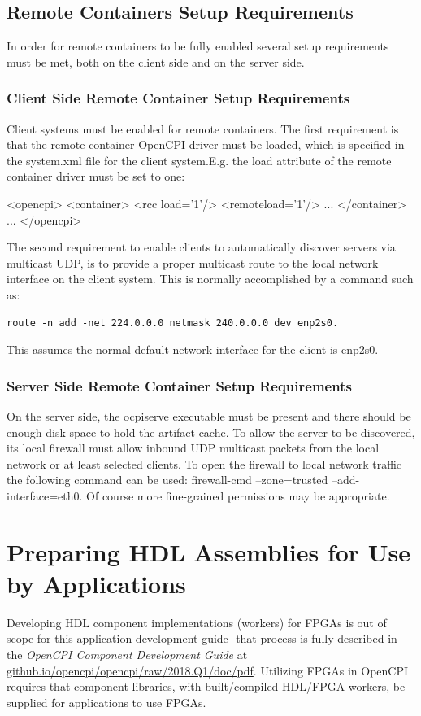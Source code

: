 \documentclass[10pt, a4paper, oneside]{article}
\renewcommand\_{\textunderscore\allowbreak} %
\begin{document}
\subsection{Remote Containers Setup Requirements} In order for remote containers to be fully enabled several setup requirements must be met, both on the client side and on the server side.
\subsubsection{Client Side Remote Container Setup Requirements}Client systems must be enabled for remote containers.  The first requirement is that the remote container OpenCPI driver must be loaded, which is specified in the system.xml file for the client system.E.g. the load attribute of the remote container driver must be set to one: \begin{ocpixml}
<opencpi>
   	<container>
    	<rcc load='1'/>
    	<remoteload='1'/>
   	...
    	</container>
   	 ...
</opencpi>\end{ocpixml}
The second requirement to enable clients to automatically discover servers via multicast UDP, is to provide a proper multicast route to the local network interface on the client system.  This is normally accomplished by a command such as:\begin{verbatim}route -n add -net 224.0.0.0 netmask 240.0.0.0 dev enp2s0. \end{verbatim} This assumes the normal default network interface for the client is enp2s0.
\subsubsection{Server Side Remote Container Setup Requirements} 
On the server side, the ocpiserve executable must be present and there should be enough disk space to hold the artifact cache. To allow the server to be discovered, its local firewall must allow inbound UDP multicast packets from the local network or at least selected clients.  To open the firewall to local network traffic the following command can be used: firewall-cmd --zone=trusted --add-interface=eth0. Of course more fine-grained permissions may be appropriate.
\section{Preparing HDL Assemblies for Use by Applications} \label{Preparing HDL Assemblies for Use by Applications}   
Developing HDL component implementations (workers) for FPGAs is out of scope for this application development guide -that process is fully described in the \emph{OpenCPI Component Development Guide} at \url{github.io/opencpi/opencpi/raw/2018.Q1/doc/pdf}.  Utilizing FPGAs in OpenCPI requires that component libraries, with built/compiled HDL/FPGA workers, be supplied for applications to use FPGAs.\\
\end{document}
